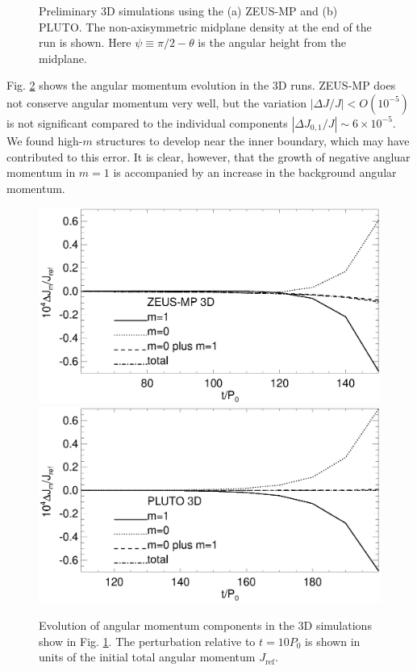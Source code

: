 \begin{figure}
\begin{center}
{    }
  \end{center}
  \caption{Preliminary 3D simulations using the (a) ZEUS-MP and (b)
    PLUTO. The non-axisymmetric midplane density at the end of the run
    is shown. Here $\psi \equiv \pi/2 - \theta$ is the angular height
    from the midplane.\label{3d_prelim}}   
\end{figure}


Fig. \ref{3d_prelim_angmom} shows the angular momentum evolution in
the 3D runs. ZEUS-MP does not conserve angular momentum very well, but
the variation $|\Delta J/J|< O(10^{-5})$ is not significant compared
to the individual components $|\Delta J_{0,1}/J|\sim
6\times10^{-5}$. We found high-$m$ structures to develop near the
inner boundary, which may have contributed to this error. It
is clear, however, that the growth of negative angluar momentum in
$m=1$ is accompanied by an increase in the background angular
momentum. 

\begin{figure}
  \includegraphics[scale=.41,clip=true,trim=0cm 1cm 0cm 0cm]{figures/nonaxi_evol_ang_zeus}
  \includegraphics[scale=.41]{figures/nonaxi_evol_ang_pluto}
  \caption{Evolution of angular momentum components in the 3D 
    simulations show in Fig. \ref{3d_prelim}. The perturbation
    relative to $t=10P_0$ is shown in units of the initial total
    angular momentum $J_\mathrm{ref}$.\label{3d_prelim_angmom}} 
\end{figure}   

